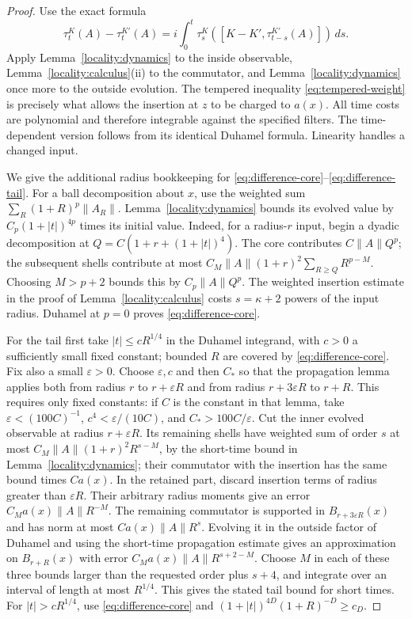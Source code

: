 \begin{proof}
Use the exact formula
\[
 \tau_t^K(A)-\tau_t^{K'}(A)
 =i\int_0^t\tau_s^K
       ([K-K',\tau_{t-s}^{K'}(A)])\,ds.
\]
Apply Lemma~\ref{locality:dynamics} to the inside observable,
Lemma~\ref{locality:calculus}(ii) to the commutator, and
Lemma~\ref{locality:dynamics} once more to the outside evolution.
The tempered inequality \eqref{eq:tempered-weight} is precisely what
allows the insertion at $z$ to be charged to $a(x)$.  All time costs
are polynomial and therefore integrable against the specified
filters.  The time-dependent version follows from its identical
Duhamel formula.  Linearity handles a changed input.

We give the additional radius bookkeeping for
\eqref{eq:difference-core}--\eqref{eq:difference-tail}.
For a ball decomposition about $x$, use the weighted sum
$\sum_R(1+R)^p\|A_R\|$.  Lemma~\ref{locality:dynamics} bounds its
evolved value by $C_p(1+|t|)^{4p}$ times its initial value.  Indeed,
for a radius-$r$ input, begin a dyadic decomposition at
$Q=C(1+r+(1+|t|)^4)$.  The core contributes $C\|A\|Q^p$;
the subsequent shells contribute at most
$C_M\|A\|(1+r)^2\sum_{R\geq Q}R^{p-M}$.
Choosing $M>p+2$ bounds this by $C_p\|A\|Q^p$.
The weighted insertion estimate in the proof of
Lemma~\ref{locality:calculus} costs $s=\kappa+2$ powers of the input
radius.  Duhamel at $p=0$ proves \eqref{eq:difference-core}.

For the tail first take $|t|\leq cR^{1/4}$ in the Duhamel integrand,
with $c>0$ a sufficiently small fixed constant; bounded $R$ are
covered by \eqref{eq:difference-core}.  Fix also a small $\varepsilon>0$.
Choose $\varepsilon,c$ and then $C_*$ so that the propagation lemma
applies both from radius $r$ to $r+\varepsilon R$ and from radius
$r+3\varepsilon R$ to $r+R$.  This requires only fixed constants:
if $C$ is the constant in that lemma, take
$\varepsilon<(100C)^{-1}$, $c^4<\varepsilon/(10C)$, and
$C_*>100C/\varepsilon$.
Cut the inner evolved observable at radius $r+\varepsilon R$.  Its remaining
shells have weighted sum of order $s$ at most
$C_M\|A\|(1+r)^2R^{s-M}$, by the short-time bound in
Lemma~\ref{locality:dynamics}; their commutator with the insertion
has the same bound times $Ca(x)$.  In the retained part, discard
insertion terms of radius greater than $\varepsilon R$.  Their arbitrary
radius moments give an error $C_Ma(x)\|A\|R^{-M}$.
The remaining commutator is supported in $B_{r+3\varepsilon R}(x)$ and has
norm at most $Ca(x)\|A\|R^s$.  Evolving it in the outside factor
of Duhamel and using the short-time propagation estimate gives
an approximation on $B_{r+R}(x)$ with error
$C_Ma(x)\|A\|R^{s+2-M}$.
Choose $M$ in each of these three bounds larger than the requested
order plus $s+4$, and integrate over an interval of length at most
$R^{1/4}$.  This gives the stated tail bound for short times.
For $|t|>cR^{1/4}$, use \eqref{eq:difference-core} and
$(1+|t|)^{4D}(1+R)^{-D}\geq c_D$.


\end{proof}
